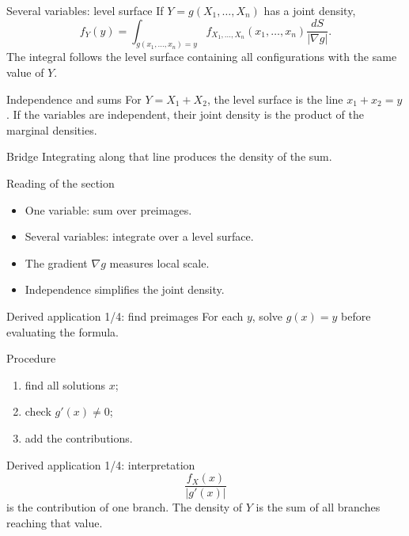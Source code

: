 \documentclass[10pt,aspectratio=169]{beamer}
\begin{document}
\begin{frame}{Several variables: level surface}
  \footnotesize
  If $Y=g(X_1,\ldots,X_n)$ has a joint density,
  \[
    f_Y(y)=\int_{g(x_1,\ldots,x_n)=y}
    f_{X_1,\ldots,X_n}(x_1,\ldots,x_n)\frac{dS}{|\nabla g|}.
  \]
  The integral follows the level surface containing all configurations with the
  same value of $Y$.
\end{frame}

\begin{frame}{Independence and sums}
  \footnotesize
  For $Y=X_1+X_2$, the level surface is the line $x_1+x_2=y$. If the variables
  are independent, their joint density is the product of the marginal densities.
  \begin{alertblock}{Bridge}
    Integrating along that line produces the density of the sum.
  \end{alertblock}
\end{frame}

\begin{frame}{Reading of the section}
  \footnotesize
  \begin{itemize}\itemsep=0.12cm
    \item One variable: sum over preimages.
    \item Several variables: integrate over a level surface.
    \item The gradient $\nabla g$ measures local scale.
    \item Independence simplifies the joint density.
  \end{itemize}
\end{frame}

\begin{frame}{Derived application 1/4: find preimages}
  \footnotesize
  For each $y$, solve $g(x)=y$ before evaluating the formula.
  \begin{block}{Procedure}
    \begin{enumerate}\itemsep=0.1cm
      \item find all solutions $x$;
      \item check $g'(x)\neq0$;
      \item add the contributions.
    \end{enumerate}
  \end{block}
\end{frame}

\begin{frame}{Derived application 1/4: interpretation}
  \footnotesize
  \[
    \frac{f_X(x)}{|g'(x)|}
  \]
  is the contribution of one branch. The density of $Y$ is the sum of all
  branches reaching that value.
\end{frame}
\end{document}

